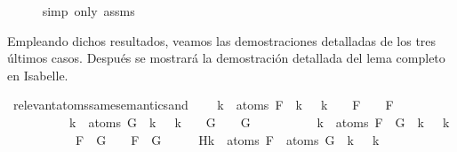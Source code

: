 \begin{isabellebody}
\ \ \ \ \isamarkupfalse%
\ {\isacharparenleft}simp\ only{\isacharcolon}\ assms{\isacharparenright}\isanewline
{}\isamarkupfalse%
%
\endisatagproof
{\isafoldproof}%
%
\isadelimproof
%
\endisadelimproof
%
\begin{isamarkuptext}%
Empleando dichos resultados, veamos las demostraciones detalladas
  de los tres últimos casos. Después se mostrará la demostración 
  detallada del lema completo en Isabelle.%
\end{isamarkuptext}\isamarkuptrue%
\isamarkupfalse%
\ relevant{\isacharunderscore}atoms{\isacharunderscore}same{\isacharunderscore}semantics{\isacharunderscore}and{\isacharcolon}\ \isanewline
\ \ \ {\isachardoublequoteopen}{\isasymforall}k\ {\isasymin}\ atoms\ F{\isachardot}\ {\isasymA}\ k\ {\isacharequal}\ {\isasymA}\ k\ {\isasymLongrightarrow}\ {\isasymA}\ {\isasymTurnstile}\ F\ {\isasymlongleftrightarrow}\ {\isasymA}\ {\isasymTurnstile}\ F{\isachardoublequoteclose}\isanewline
\ \ \ \ \ \ \ \ \ \ {\isachardoublequoteopen}{\isasymforall}k\ {\isasymin}\ atoms\ G{\isachardot}\ {\isasymA}\ k\ {\isacharequal}\ {\isasymA}\ k\ {\isasymLongrightarrow}\ {\isasymA}\ {\isasymTurnstile}\ G\ {\isasymlongleftrightarrow}\ {\isasymA}\ {\isasymTurnstile}\ G{\isachardoublequoteclose}\isanewline
\ \ \ \ \ \ \ \ \ \ {\isachardoublequoteopen}{\isasymforall}k\ {\isasymin}\ atoms\ {\isacharparenleft}F\ \isactrlbold {\isasymand}\ G{\isacharparenright}{\isachardot}\ {\isasymA}\ k\ {\isacharequal}\ {\isasymA}\ k{\isachardoublequoteclose}\isanewline
\ \ \ \ \ \ \ \ \ {\isachardoublequoteopen}{\isasymA}\ {\isasymTurnstile}\ {\isacharparenleft}F\ \isactrlbold {\isasymand}\ G{\isacharparenright}\ {\isasymlongleftrightarrow}\ {\isasymA}\ {\isasymTurnstile}\ {\isacharparenleft}F\ \isactrlbold {\isasymand}\ G{\isacharparenright}{\isachardoublequoteclose}\isanewline
%
\isadelimproof
%
\endisadelimproof
%
\isatagproof
{}\isamarkupfalse%
\ {\isacharminus}\isanewline
\ \ \isamarkupfalse%
\ H{\isacharcolon}{\isachardoublequoteopen}{\isasymforall}k\ {\isasymin}\ atoms\ F\ {\isasymunion}\ atoms\ G{\isachardot}\ {\isasymA}\ k\ {\isacharequal}\ {\isasymA}\ k{\isachardoublequoteclose}\ \isamarkupfalse%

\end{isabellebody}
